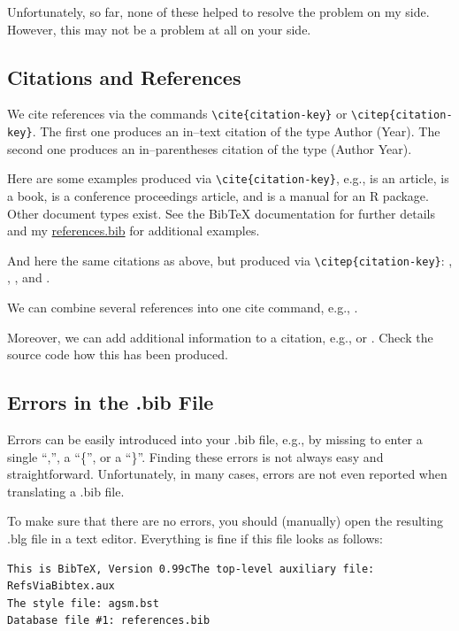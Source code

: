\documentclass[12pt]{article}
\begin{document}
Unfortunately, so far, none of these helped to resolve the problem on my side.
However, this may not be a problem at all on your side.



\subsection{Citations and References}

We cite references via the commands \verb|\cite{citation-key}|
or \verb|\citep{citation-key}|. The first one produces
an in--text citation of the type Author (Year). The second one
produces an in--parentheses citation of the type (Author Year).

Here are some examples produced via \verb|\cite{citation-key}|,
e.g., \cite{Sym2011} is an article,
\cite{RS2006} is a book, \cite{SEGVW2004ASA} is
a conference proceedings article, and
\cite{CW2011} is a manual for an R package.
Other document types exist. See the BibTeX documentation
for further details
and my \url{references.bib} for additional examples.

And here the same citations as above, but produced via
\verb|\citep{citation-key}|:
\citep{Sym2011}, \citep{RS2006}, \citep{SEGVW2004ASA}, and \citep{CW2011}.

We can combine several references into one cite command, e.g.,
\citep{We50,Pajarola:98th}.

Moreover, we can add additional information to a citation, e.g.,
\citep[p.~486]{Sym2011} or \citep[see for example][p.~487]{Sym2011}.
Check the source code how this has been produced.

\subsection{Errors in the .bib File}

Errors can be easily introduced into your .bib file, e.g., by missing to
enter a single ``,'', a ``\{'', or a ``\}''. Finding these errors is not
always easy and straightforward. Unfortunately, in many cases,
errors are not even reported when translating a .bib file.

To make sure that there are no errors, you should (manually)
open the resulting .blg file in a text editor. Everything
is fine if this file looks as follows:
\begin{verbatim}
This is BibTeX, Version 0.99cThe top-level auxiliary file: RefsViaBibtex.aux
The style file: agsm.bst
Database file #1: references.bib
\end{verbatim}
\end{document}
